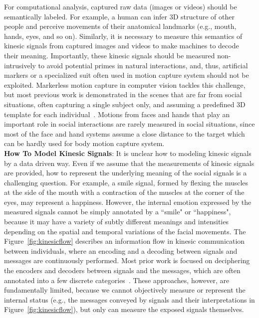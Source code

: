 For computational analysis, captured raw data (images or videos) should be semantically labeled. For example, a human can infer 3D structure of other people and perceive movements of their anatomical landmarks (e.g., mouth, hands, eyes, and so on). Similarly, it is necessary to measure this semantics of kinesic signals from captured images and videos to make machines to decode their meaning. Importantly, these kinesic signals should be measured non-intrusively to avoid potential primes in natural interactions, and, thus, artificial markers or a specialized suit often used in motion capture system should not be exploited. Markerless motion capture in computer vision tackles this challenge, but most previous work is demonstrated in the scenes that are far from social situations, often capturing a single subject only, and assuming a predefined 3D template for each individual~\cite{Gall-09, Vlasic-08, Brox-10, Stoll-11, deAguiar-2008, Vlasic-2008}. Motions from faces and hands that play an important role in social interactions are rarely measured in social situations, since most of the face and hand systems assume a close distance to the target which can be hardly used for body motion capture system. \\

\noindent \textbf{How To Model Kinesic Signals}: 
It is unclear how to modeling kinesic signals by a data driven way. Even if we assume that the measurements of kinesic signals are provided, how to represent the underlying meaning of the social signals is a challenging question. For example, a smile signal, formed by flexing the muscles at the side of the mouth with a contraction of the muscles at the corner of the eyes, may represent a happiness. However, the internal emotion expressed by the measured signals cannot be simply annotated by a ``smile" or ``happiness", because it may have a variety of subtly different meanings and intensities depending on the spatial and temporal variations of the facial movements. The Figure~\ref{fig:kinesicflow} describes an information flow in kinesic communication between individuals, where an encoding and a decoding between signals and messages are continuously performed. Most prior work is focused on deciphering the encoders and decoders between signals and the messages, which are often annotated into a few discrete categories~\cite{pantic2000automatic,cowie2001emotion,shan2009facial,cowie2001emotion,gunes2006bimodal}. These approaches, however, are fundamentally limited, because we cannot objectively measure or represent the internal status (e.g., the messages conveyed by signals and their interpretations in Figure~\ref{fig:kinesicflow}), but only can measure the exposed signals themselves.

